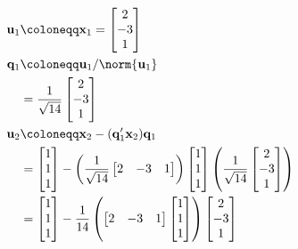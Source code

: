 \begin{align*}
\mathbf{u}_1 & \coloneqq \mathbf{x}_1 = \begin{bmatrix}
                                         2\\-3\\1
                                        \end{bmatrix}
  \\
\mathbf{q}_1 & \coloneqq \mathbf{u}_1 / \norm{\mathbf{u}_1}\\
&= \frac{1}{\sqrt{14}} \begin{bmatrix}
                        2\\-3\\1
                       \end{bmatrix}
                       \\
\mathbf{u}_2 & \coloneqq \mathbf{x}_2 - (\mathbf{q}_1'\mathbf{x}_2)\mathbf{q}_1\\
&= \begin{bmatrix}
    1 \\ 1 \\1
   \end{bmatrix}
- \left (
\frac{1}{\sqrt{14}}\begin{bmatrix}
   2 & -3 & 1
  \end{bmatrix}
  \right )
\begin{bmatrix}
 1\\1\\1
\end{bmatrix}
\left (
\frac{1}{\sqrt{14}}
\begin{bmatrix}
 2\\-3\\1
\end{bmatrix}
\right)
\\
&= \begin{bmatrix}
    1 \\ 1 \\1
   \end{bmatrix}
   -
   \frac{1}{14}
   \left(
   \begin{bmatrix}
   2 & -3 & 1
  \end{bmatrix}
  \begin{bmatrix}
 1\\1\\1
\end{bmatrix}
\right)
\begin{bmatrix}
 2\\-3\\1
\end{bmatrix}\\

\end{align*}

